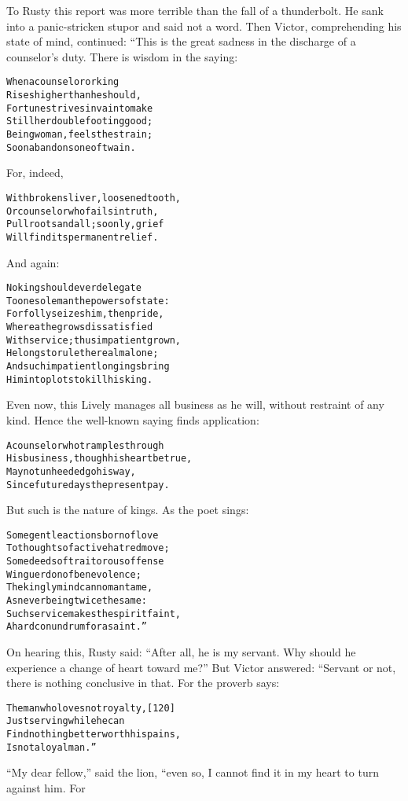 \documentclass{article}
\renewenvironment{verbatim}{\begin{alltt}\normalfont\begin{centering}}{\end{centering}\end{alltt}}
\begin{document}
To Rusty this report was more terrible than the fall of a
thunderbolt. He sank into a panic-stricken stupor and said not a
word. Then Victor, comprehending his state of mind, continued:
“This is the great sadness in the discharge of a counselor's duty.
There is wisdom in the saying:

\begin{verbatim}
When a counselor or king
    Rises higher than he should,
Fortune strives in vain to make
    Still her double footing good;
Being woman, feels the strain;
Soon abandons one of twain.
\end{verbatim}
For, indeed,

\begin{verbatim}
With broken sliver, loosened tooth,
Or counselor who fails in truth,
Pull roots and all; so only, grief
Will find its permanent relief.
\end{verbatim}
And again:

\begin{verbatim}
No king should ever delegate
To one sole man the powers of state:
For folly seizes him, then pride,
Whereat he grows dissatisfied
With service; thus impatient grown,
He longs to rule the realm alone;
And such impatient longings bring
Him into plots to kill his king.
\end{verbatim}
Even now, this Lively manages all business as he will, without
restraint of any kind. Hence the well-known saying finds
application:

\begin{verbatim}
A counselor who tramples through
His business, though his heart be true,
May not unheeded go his way,
Since future days the present pay.
\end{verbatim}
But such is the nature of kings. As the poet sings:

\begin{verbatim}
Some gentle actions born of love
To thoughts of active hatred move;
Some deeds of traitorous offense
Win guerdon of benevolence;
The kingly mind can no man tame,
As never being twice the same:
Such service makes the spirit faint,
A hard conundrum for a saint.”
\end{verbatim}
On hearing this, Rusty said:
``After all, he is my servant. Why should he experience a change of heart toward me?''
But Victor answered: “Servant or not, there is nothing conclusive
in that. For the proverb says:

\begin{verbatim}
The man who loves not royalty,                          [120]
    Just serving while he can
Find nothing better worth his pains,
    Is not a loyal man.”
\end{verbatim}
``My dear fellow,'' said the lion, “even so, I cannot find it in my
heart to turn against him. For
\end{document}
